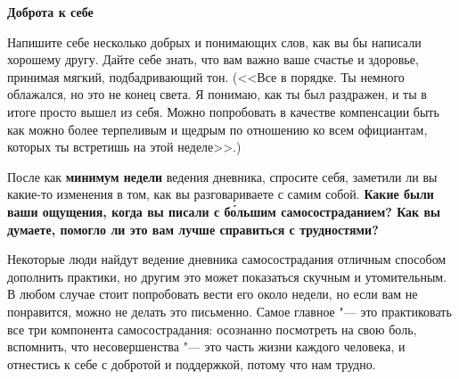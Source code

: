 \textbf{Доброта к себе}

Напишите себе несколько добрых и понимающих слов, как вы бы написали хорошему другу. Дайте себе знать, что вам важно ваше счастье и здоровье, принимая мягкий, подбадривающий тон. (<<Все в порядке. Ты немного облажался, но это не конец света. Я понимаю, как ты был раздражен, и ты в итоге просто вышел из себя. Можно попробовать в качестве компенсации быть как можно более терпеливым и щедрым по отношению ко всем официантам, которых ты встретишь на этой неделе>>.) 

\vspace{5ex}


\vspace{3ex}
После как \textbf{минимум недели} ведения дневника, спросите себя, заметили ли вы какие-то изменения в том, как вы разговариваете с самим собой. \textbf{Какие были ваши ощущения, когда вы писали с б\'{о}льшим самосостраданием? Как вы думаете, помогло ли это вам лучше справиться с трудностями?}

Некоторые люди найдут ведение дневника самосострадания отличным способом дополнить практики, но другим это может показаться скучным и утомительным. В любом случае стоит попробовать вести его около недели, но если вам не понравится, можно не делать это письменно. Самое главное "--- это практиковать все три компонента самосострадания: осознанно посмотреть на свою боль, вспомнить, что несовершенства "--- это часть жизни каждого человека, и отнестись к себе с добротой и поддержкой, потому что нам трудно.



